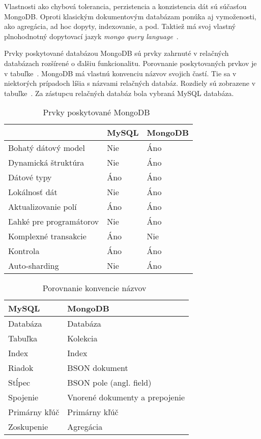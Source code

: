 Vlastnosti ako chybová tolerancia, perzistencia a konzistencia dát sú súčasťou MongoDB. Oproti klasickým dokumentovým databázam ponúka aj vymoženosti, ako agregácia, ad hoc dopyty, indexovanie, a pod. Taktiež má svoj vlastný plnohodnotný dopytovací jazyk \textit{mongo query language}~\cite{NoSQLDBvsRealtionDB}.

Prvky poskytované databázou MongoDB sú prvky zahrnuté v relačných databázach rozšírené o ďalšiu funkcionalitu. Porovnanie poskytovaných prvkov je v tabuľke~. MongoDB má vlastnú konvenciu názvov svojich častí. Tie sa v niektorých prípadoch líšia s názvami relačných databáz. Rozdiely sú zobrazene v tabuľke~. Za zástupcu relačných databáz bola vybraná MySQL databáza.

\begin{table}[]
	\centering
	\caption{Prvky poskytované MongoDB~\cite{MongoDBvsMySQLCompared}}
	\label{table:features_of_mongodb}
	\begin{tabular}{|l|l|l|}
	\hline
		& \textbf{MySQL} & \textbf{MongoDB} \\ \hline
		Bohatý dátový model & Nie & Áno \\ \hline
		Dynamická štruktúra & Nie & Áno \\ \hline
		Dátové typy & Áno & Áno \\ \hline
		Lokálnosť dát & Nie & Áno \\ \hline
		Aktualizovanie polí & Áno & Áno \\ \hline
		Ľahké pre programátorov & Nie & Áno \\ \hline
		Komplexné transakcie & Áno & Nie \\ \hline
		Kontrola & Áno & Áno \\ \hline
		Auto-sharding & Nie & Áno \\ \hline
	\end{tabular}
\end{table}

\begin{table}[]
	\centering
	\caption{Porovnanie konvencie názvov~\cite{MongoDBvsMySQL2015}}
	\label{table:names_of_mongodb}
	\begin{tabular}{|l|l|}
	\hline
		\textbf{MySQL} & \textbf{MongoDB} \\ \hline
		Databáza & Databáza \\ \hline
		Tabuľka & Kolekcia \\ \hline
		Index & Index \\ \hline
		Riadok & BSON dokument \\ \hline
		Stĺpec & BSON pole (angl. field) \\ \hline
		Spojenie & Vnorené dokumenty a prepojenie \\ \hline
		Primárny kľúč & Primárny kľúč \\ \hline
		Zoskupenie & Agregácia \\ \hline
	\end{tabular}
\end{table}
